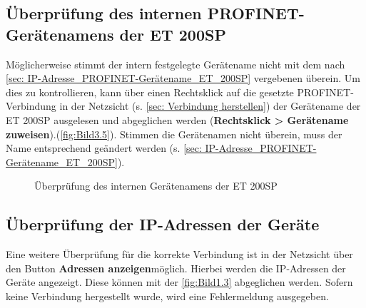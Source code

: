 \subsection{Überprüfung des internen PROFINET-Gerätenamens der ET 200SP}
Möglicherweise stimmt der intern festgelegte Gerätename nicht mit dem nach \autoref{sec: IP-Adresse_PROFINET-Gerätename_ET_200SP} vergebenen überein. Um dies zu kontrollieren, kann über einen Rechtsklick auf die gesetzte PROFINET-Verbindung in der Netzsicht (s. \autoref{sec: Verbindung herstellen}) der Gerätename der ET 200SP ausgelesen und abgeglichen werden (\textbf{Rechtsklick > Gerätename zuweisen}).(\autoref{fig:Bild3.5}).  Stimmen die Gerätenamen nicht überein, muss der Name entsprechend geändert werden (s. \autoref{sec: IP-Adresse_PROFINET-Gerätename_ET_200SP}).

\begin{figure}[H]
   \centering
   \caption[Überprüfung des internen Gerätenamens der ET 200SP]{Überprüfung des internen Gerätenamens der ET 200SP}
   \label{fig:Bild5.3}
\end{figure}

\subsection{Überprüfung der IP-Adressen der Geräte}
Eine weitere Überprüfung für die korrekte Verbindung ist in der Netzsicht über den Button \glqq\textbf{Adressen anzeigen}\grqq\:möglich. Hierbei werden die IP-Adressen der Geräte angezeigt. Diese können mit der \autoref{fig:Bild1.3} abgeglichen werden. Sofern keine Verbindung hergestellt wurde, wird eine Fehlermeldung ausgegeben.

